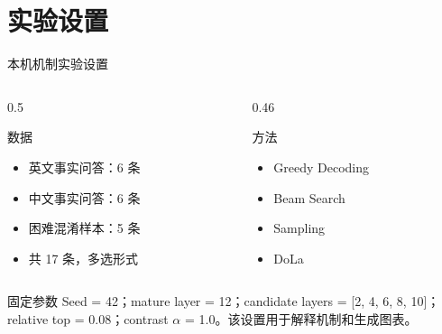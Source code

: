 \documentclass[aspectratio=169,11pt]{ctexbeamer}
\begin{document}
\section{实验设置}

\begin{frame}{本机机制实验设置}
  \small
  \begin{columns}[T,onlytextwidth]
    \begin{column}{0.5\textwidth}
      \begin{block}{数据}
        \begin{itemize}
          \item 英文事实问答：6 条
          \item 中文事实问答：6 条
          \item 困难混淆样本：5 条
          \item 共 17 条，多选形式
        \end{itemize}
      \end{block}
    \end{column}
    \begin{column}{0.46\textwidth}
      \begin{block}{方法}
        \begin{itemize}
          \item Greedy Decoding
          \item Beam Search
          \item Sampling
          \item DoLa
        \end{itemize}
      \end{block}
    \end{column}
  \end{columns}

  \vspace{0.2em}
  \begin{block}{固定参数}
    Seed = 42；mature layer = 12；candidate layers = [2, 4, 6, 8, 10]；
    relative top = 0.08；contrast $\alpha$ = 1.0。该设置用于解释机制和生成图表。
  \end{block}
\end{frame}
\end{document}
